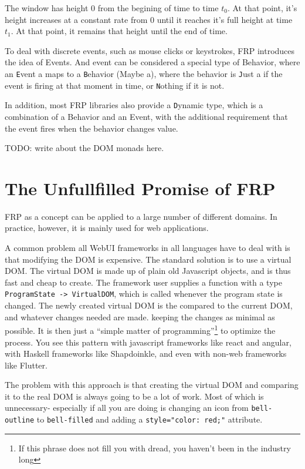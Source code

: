 \documentclass{article}
\begin{document}
The window has height 0 from the begining of time to time $t_0$.  At that
point, it's height increases at a constant rate from 0 until it reaches it's
full height at time $t_1$.  At that point, it remains that height until the
end of time.

To deal with discrete events, such as mouse clicks or keystrokes, FRP
introduces the idea of Events.  And event can be considered a special
type of Behavior, where an {\texttt Event a} maps to a 
{\texttt Behavior (Maybe a)}, where the behavior is {\texttt Just a} if
the event is firing at that moment in time, or {\texttt Nothing} if it
is not.

In addition, most FRP libraries also provide a {\texttt Dynamic} type,
which is a combination of a Behavior and an Event, with the additional
requirement that the event fires when the behavior changes value.

TODO: write about the DOM monads here.

\section{The Unfullfilled Promise of FRP}

FRP as a concept can be applied to a large number of different domains.  In
practice, however, it is mainly used for web applications.

A common problem all WebUI frameworks in all languages have to deal with
is that modifying the DOM is expensive.  The standard solution is to
use a virtual DOM.  The virtual DOM is made up of plain old Javascript
objects, and is thus fast and cheap to create.  The framework user
supplies a function with a type \verb|ProgramState -> VirtualDOM|, which
is called whenever the program state is changed.  The newly created
virtual DOM is the compared to the current DOM, and whatever changes
needed are made. keeping the changes as minimal as possible.  It is then
just a ``simple matter of programming''\footnote{If this phrase does not
fill you with dread, you haven't been in the industry long} to optimize
the process.  You see this pattern with javascript frameworks like react
and angular, with Haskell frameworks like Shapdoinkle, and even with
non-web frameworks like Flutter.

The problem with this approach is that creating the virtual DOM and
comparing it to the real DOM is always going to be a lot of work.  Most
of which is unnecessary- especially if all you are doing is changing
an icon from \verb|bell-outline| to \verb|bell-filled| and adding a
\verb|style="color: red;"| attribute.
\end{document}
